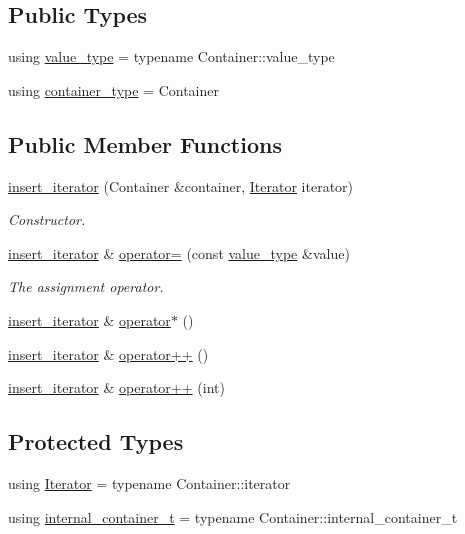 \subsection*{Public Types}
\begin{DoxyCompactItemize}
\item 
using \hyperlink{classshad_1_1insert__iterator_a0a364f131900a4898acb9a8e499c6070}{value\-\_\-type} = typename Container\-::value\-\_\-type
\item 
using \hyperlink{classshad_1_1insert__iterator_a0ab6d747c808ebbaf2e00213490585f4}{container\-\_\-type} = Container
\end{DoxyCompactItemize}
\subsection*{Public Member Functions}
\begin{DoxyCompactItemize}
\item 
\hyperlink{classshad_1_1insert__iterator_a2285f56ef6b37912b8af1700f39e62f1}{insert\-\_\-iterator} (Container \&container, \hyperlink{classshad_1_1insert__iterator_a9423151fee020bc148d8c6037ecb0542}{Iterator} iterator)
\begin{DoxyCompactList}\small\item\em Constructor. \end{DoxyCompactList}\item 
\hyperlink{classshad_1_1insert__iterator}{insert\-\_\-iterator} \& \hyperlink{classshad_1_1insert__iterator_a8f5d1c522b2f339db25b69974a41e0d6}{operator=} (const \hyperlink{classshad_1_1insert__iterator_a0a364f131900a4898acb9a8e499c6070}{value\-\_\-type} \&value)
\begin{DoxyCompactList}\small\item\em The assignment operator. \end{DoxyCompactList}\item 
\hyperlink{classshad_1_1insert__iterator}{insert\-\_\-iterator} \& \hyperlink{classshad_1_1insert__iterator_a58059a463666bc70b7804c399317d87d}{operator$\ast$} ()
\item 
\hyperlink{classshad_1_1insert__iterator}{insert\-\_\-iterator} \& \hyperlink{classshad_1_1insert__iterator_adf7bda892033b37e6cb139b62350c9c2}{operator++} ()
\item 
\hyperlink{classshad_1_1insert__iterator}{insert\-\_\-iterator} \& \hyperlink{classshad_1_1insert__iterator_ad5ce27986d772edaabee569317b49ec5}{operator++} (int)
\end{DoxyCompactItemize}
\subsection*{Protected Types}
\begin{DoxyCompactItemize}
\item 
using \hyperlink{classshad_1_1insert__iterator_a9423151fee020bc148d8c6037ecb0542}{Iterator} = typename Container\-::iterator
\item 
using \hyperlink{classshad_1_1insert__iterator_a040650a6a725c67ff6b4331cef06afaa}{internal\-\_\-container\-\_\-t} = typename Container\-::internal\-\_\-container\-\_\-t
\end{DoxyCompactItemize}
